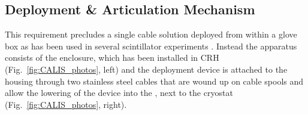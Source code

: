 \subsection{Deployment \& Articulation Mechanism}\label{sec:DeploymentArticulation}
This requirement precludes a single cable solution deployed from within a glove box as has been used in several scintillator experiments \cite{Banks:2014hra, Huang:2013uxa}. %
Instead the apparatus consists of the enclosure, which has been installed in CRH (Fig.~\ref{fig:CALIS_photos}, left) and the deployment device is attached to the housing through two stainless steel cables that are wound up on cable spools and allow the lowering of the device into the \lsv, next to the cryostat (Fig.~\ref{fig:CALIS_photos}, right).
